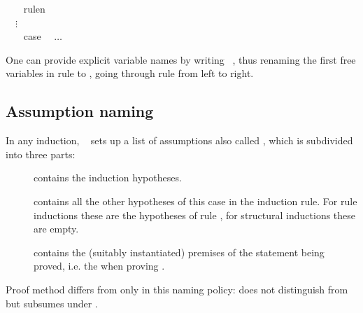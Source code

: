 \begin{isabellebody}
\isamarkupfalse%
\isanewline
\ \ \isamarkupfalse%
\ rule\isactrlisub n%
\\[-.4ex]\mbox{}\ \ $\vdots$\\[-.4ex]\mbox{}\hspace{-1ex}
\ \ \isamarkupfalse%
\ {}case\ %
\ $\dots$\\
\isamarkupfalse%
%
\endisatagproof
{\isafoldproof}%
%
\isadelimproof
%
\endisadelimproof
%
\begin{isamarkuptext}%
One can provide explicit variable names by writing
~, thus renaming the first 
free variables in rule  to ,
going through rule  from left to right.

\subsection{Assumption naming}

In any induction, ~ sets up a list of assumptions
also called , which is subdivided into three parts:
\begin{description}
\item[] contains the induction hypotheses.
\item[] contains all the other hypotheses of this case in the
induction rule. For rule inductions these are the hypotheses of rule
, for structural inductions these are empty.
\item[] contains the (suitably instantiated) premises
of the statement being proved, i.e. the  when
proving .
\end{description}
\begin{warn}
Proof method  differs from 
only in this naming policy:  does not distinguish
 from  but subsumes  under .
\end{warn}


\end{isamarkuptext}
\end{isabellebody}

